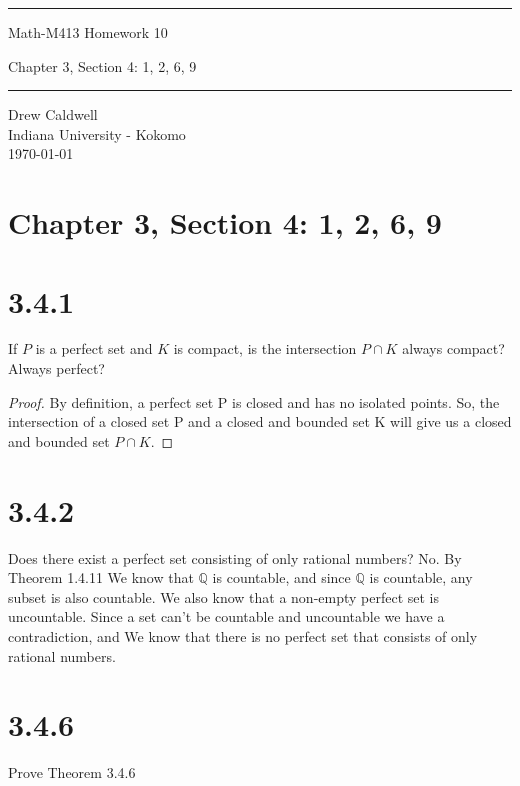 \documentclass{article}
\begin{document}
\begin{titlepage}
\scshape
\centering
\raisebox{-\baselineskip}{\rule{\textwidth}{1px}}
\vspace{.3cm}
\rule{\textwidth}{.5px}
\vspace{.3cm}
{\huge{{Math-M413 Homework 10}}}\par \vspace{0.3cm}
Chapter 3, Section 4: 1, 2, 6, 9
\rule{\textwidth}{2px}

\large{Drew Caldwell}\\
\large{Indiana University - Kokomo}\\
\vspace{1.3cm}
\vfill
\today
\end{titlepage}

\section*{Chapter 3, Section 4: 1, 2, 6, 9}

\section*{3.4.1}
If $P$ is a perfect set and $K$ is compact, is the intersection $P \cap K$ always compact? Always perfect?

\begin{proof}
By definition, a perfect set P is closed and has no isolated points. So, the intersection of a closed set P and a closed and bounded set K will give us a closed and bounded set $P \cap K$.
\end{proof}

\section*{3.4.2}
Does there exist a perfect set consisting of only rational numbers?
\newline
\newline
No. By Theorem 1.4.11 We know that $\mathbb{Q}$ is countable, and since $\mathbb{Q}$ is countable, any subset is also countable. We also know that a non-empty perfect set is uncountable. Since a set can't be countable and uncountable we have a contradiction, and We know that there is no perfect set that consists of only rational numbers.


\section*{3.4.6}
Prove Theorem 3.4.6
\end{document}
